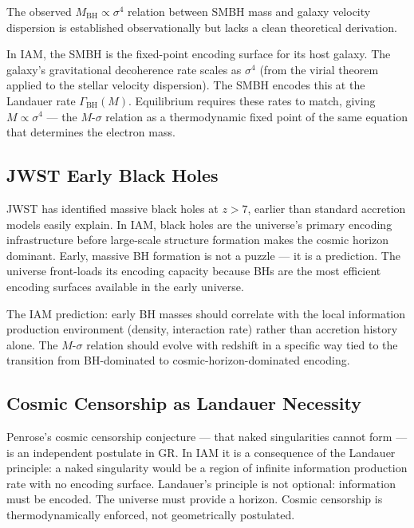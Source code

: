 \documentclass[12pt,letterpaper]{article}
\begin{document}
The observed $M_\text{BH} \propto \sigma^4$ relation between SMBH mass
and galaxy velocity dispersion is established observationally but
lacks a clean theoretical derivation.

In IAM, the SMBH is the fixed-point encoding surface for its host galaxy.
The galaxy's gravitational decoherence rate scales as $\sigma^4$
(from the virial theorem applied to the stellar velocity dispersion).
The SMBH encodes this at the Landauer rate $\Gamma_\text{BH}(M)$.
Equilibrium requires these rates to match, giving $M \propto \sigma^4$
--- the $M$-$\sigma$ relation as a thermodynamic fixed point of the
same equation that determines the electron mass.

\subsection{JWST Early Black Holes}

JWST has identified massive black holes at $z > 7$, earlier than
standard accretion models easily explain.
In IAM, black holes are the universe's primary encoding infrastructure
before large-scale structure formation makes the cosmic horizon dominant.
Early, massive BH formation is not a puzzle --- it is a prediction.
The universe front-loads its encoding capacity because BHs are
the most efficient encoding surfaces available in the early universe.

The IAM prediction: early BH masses should correlate with the
local information production environment (density, interaction rate)
rather than accretion history alone.
The $M$-$\sigma$ relation should evolve with redshift in a specific way
tied to the transition from BH-dominated to cosmic-horizon-dominated encoding.

\subsection{Cosmic Censorship as Landauer Necessity}

Penrose's cosmic censorship conjecture --- that naked singularities
cannot form --- is an independent postulate in GR.
In IAM it is a consequence of the Landauer principle:
a naked singularity would be a region of infinite information
production rate with no encoding surface.
Landauer's principle is not optional: information must be encoded.
The universe must provide a horizon. Cosmic censorship is
thermodynamically enforced, not geometrically postulated.

\end{document}
